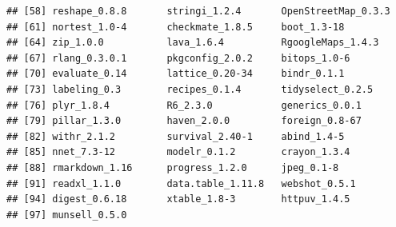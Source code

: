 \documentclass[12pt,a4paper,oneside, openany]{book}
\theoremstyle{definition}
\theoremstyle{definition}
\theoremstyle{definition}
\theoremstyle{remark}
\begin{document}
\begin{verbatim}
## [58] reshape_0.8.8       stringi_1.2.4       OpenStreetMap_0.3.3
## [61] nortest_1.0-4       checkmate_1.8.5     boot_1.3-18        
## [64] zip_1.0.0           lava_1.6.4          RgoogleMaps_1.4.3  
## [67] rlang_0.3.0.1       pkgconfig_2.0.2     bitops_1.0-6       
## [70] evaluate_0.14       lattice_0.20-34     bindr_0.1.1        
## [73] labeling_0.3        recipes_0.1.4       tidyselect_0.2.5   
## [76] plyr_1.8.4          R6_2.3.0            generics_0.0.1     
## [79] pillar_1.3.0        haven_2.0.0         foreign_0.8-67     
## [82] withr_2.1.2         survival_2.40-1     abind_1.4-5        
## [85] nnet_7.3-12         modelr_0.1.2        crayon_1.3.4       
## [88] rmarkdown_1.16      progress_1.2.0      jpeg_0.1-8         
## [91] readxl_1.1.0        data.table_1.11.8   webshot_0.5.1      
## [94] digest_0.6.18       xtable_1.8-3        httpuv_1.4.5       
## [97] munsell_0.5.0
\end{verbatim}
\end{document}
